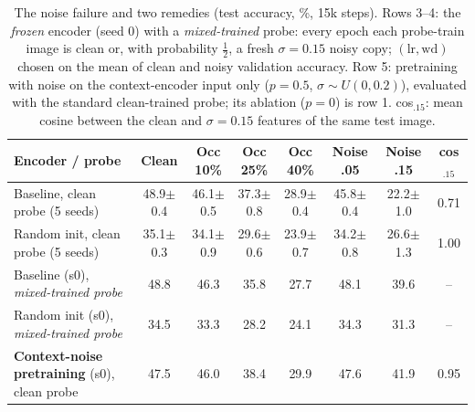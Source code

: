 \begin{table}[t]\centering\small\setlength{\tabcolsep}{3.2pt}
\caption{The noise failure and two remedies (test accuracy, \%, 15k steps). Rows 3--4: the \emph{frozen} encoder (seed 0) with a \emph{mixed-trained} probe: every epoch each probe-train image is clean or, with probability $\tfrac12$, a fresh $\sigma{=}0.15$ noisy copy; $(\mathrm{lr},\mathrm{wd})$ chosen on the mean of clean and noisy validation accuracy. Row 5: pretraining with noise on the context-encoder input only ($p{=}0.5$, $\sigma\sim U(0,0.2)$), evaluated with the standard clean-trained probe; its ablation ($p{=}0$) is row 1. cos$_{.15}$: mean cosine between the clean and $\sigma{=}0.15$ features of the same test image.}
\label{tab:noise}
\begin{tabular}{lccccccc}\toprule
Encoder / probe & Clean & Occ 10\% & Occ 25\% & Occ 40\% & Noise .05 & Noise .15 & cos$_{.15}$ \\\midrule
Baseline, clean probe (5 seeds) & 48.9{\scriptsize$\pm$0.4} & 46.1{\scriptsize$\pm$0.5} & 37.3{\scriptsize$\pm$0.8} & 28.9{\scriptsize$\pm$0.4} & 45.8{\scriptsize$\pm$0.4} & 22.2{\scriptsize$\pm$1.0} & 0.71 \\
Random init, clean probe (5 seeds) & 35.1{\scriptsize$\pm$0.3} & 34.1{\scriptsize$\pm$0.9} & 29.6{\scriptsize$\pm$0.6} & 23.9{\scriptsize$\pm$0.7} & 34.2{\scriptsize$\pm$0.8} & 26.6{\scriptsize$\pm$1.3} & 1.00 \\\midrule
Baseline (s0), \emph{mixed-trained probe} & 48.8 & 46.3 & 35.8 & 27.7 & 48.1 & 39.6 & -- \\
Random init (s0), \emph{mixed-trained probe} & 34.5 & 33.3 & 28.2 & 24.1 & 34.3 & 31.3 & -- \\
\midrule
\textbf{Context-noise pretraining} (s0), clean probe & 47.5 & 46.0 & 38.4 & 29.9 & 47.6 & 41.9 & 0.95 \\
\bottomrule\end{tabular}\end{table}
